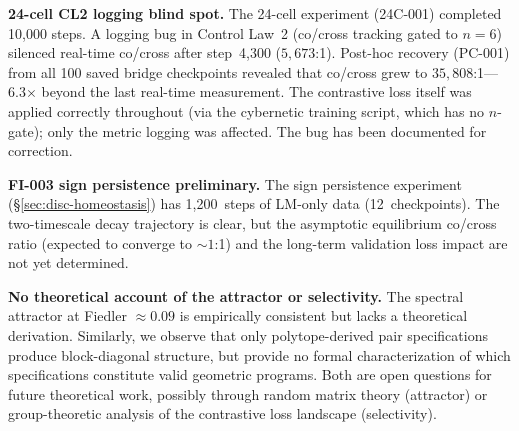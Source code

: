 \textbf{24-cell CL2 logging blind spot.}
The 24-cell experiment (24C-001) completed 10{,}000 steps. A logging bug
in Control Law~2 (co/cross tracking gated to $n{=}6$) silenced real-time
co/cross after step~4{,}300 ($5{,}673$:1). Post-hoc recovery (PC-001)
from all 100 saved bridge checkpoints revealed that co/cross grew to
$35{,}808$:1---6.3$\times$ beyond the last real-time measurement. The
contrastive loss itself was applied correctly throughout (via the
cybernetic training script, which has no $n$-gate); only the metric
logging was affected. The bug has been documented for correction.

\textbf{FI-003 sign persistence preliminary.}
The sign persistence experiment (\S\ref{sec:disc-homeostasis}) has
1{,}200~steps of LM-only data (12~checkpoints). The two-timescale decay
trajectory is clear, but the asymptotic equilibrium co/cross ratio
(expected to converge to ${\sim}1$:1) and the long-term validation
loss impact are not yet determined.

\textbf{No theoretical account of the attractor or selectivity.}
The spectral attractor at Fiedler $\approx 0.09$ is empirically
consistent but lacks a theoretical derivation. Similarly, we observe
that only polytope-derived pair specifications produce block-diagonal
structure, but provide no formal characterization of which
specifications constitute valid geometric programs. Both are open
questions for future theoretical work, possibly through random matrix
theory (attractor) or group-theoretic analysis of the contrastive loss
landscape (selectivity).
